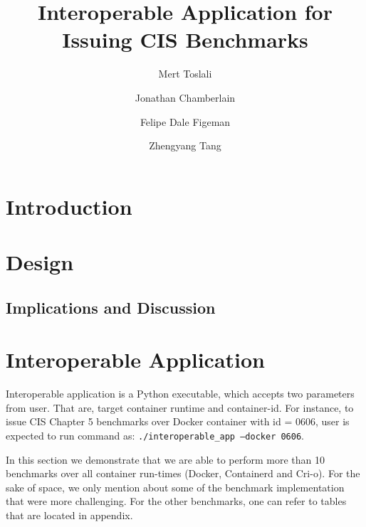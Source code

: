 \documentclass[times, twoside, watermark]{zHenriquesLab-StyleBioRxiv}
\begin{document}
\title{Interoperable Application for Issuing CIS Benchmarks }


\author[1]{Mert Toslali}
\author[1]{Jonathan Chamberlain}
\author[1]{Felipe Dale Figeman}
\author[1]{Zhengyang Tang}


\maketitle

\begin{abstract}

\end {abstract}



\section*{Introduction}


\section*{Design}


\subsection*{Implications and Discussion}





\section*{Interoperable Application}

Interoperable application is a Python executable, which accepts two parameters from user. That are, target container runtime and container-id. For instance, to issue CIS Chapter 5 benchmarks over Docker container with id = 0606, user is expected to run command as:
\texttt{./interoperable\_app --docker 0606}.



In this section we demonstrate that we are able to perform more than 10 benchmarks over all container run-times (Docker, Containerd and Cri-o). For the sake of space, we only
mention about some of the benchmark implementation that were more challenging. For the other benchmarks, one can refer to tables that are located in appendix.



\end{document}

